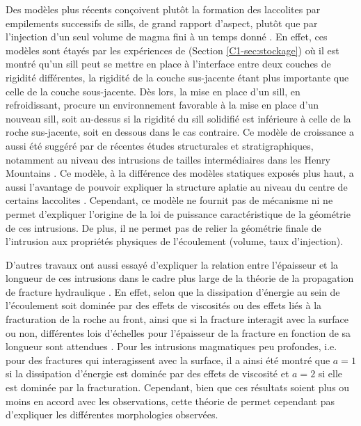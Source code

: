 Des modèles plus récents conçoivent plutôt la formation des laccolites
par empilements successifs de sills, de grand rapport d'aspect, plutôt
que par  l'injection d'un seul volume  de magma fini à  un temps donné
\citep{Menand:2011ki}.   En effet,  ces  modèles sont  étayés par  les
expériences de \citet{Kavanagh:2006ig} (Section \ref{C1-sec:stockage})
où il  est montré  qu'un sill  peut se mettre  en place  à l'interface
entre deux couches  de rigidité différentes, la rigidité  de la couche
sus-jacente   étant   plus  importante   que   celle   de  la   couche
sous-jacente. Dès lors, la mise  en place d'un sill, en refroidissant,
procure un  environnement favorable  à la mise  en place  d'un nouveau
sill, soit au-dessus si la rigidité du sill solidifié est inférieure à
celle  de  la   roche  sus-jacente,  soit  en  dessous   dans  le  cas
contraire. Ce modèle de croissance a aussi été suggéré par de récentes
études  structurales  et  stratigraphiques, notamment  au  niveau  des
intrusions  de   tailles  intermédiaires  dans  les   Henry  Mountains
\citep{Horsman:2005ct,Morgan:2008hj,Horsman:2009gea,Menand:2011ki}. Ce
modèle, à  la différence  des modèles statiques  exposés plus  haut, a
aussi l'avantage de  pouvoir expliquer la structure  aplatie au niveau
du centre de certains laccolites \citep{Morgan:2008hj}.  Cependant, ce
modèle ne fournit pas de  mécanisme ni ne permet d'expliquer l'origine
de  la  loi  de  puissance  caractéristique de  la  géométrie  de  ces
intrusions. De plus, il ne permet pas de relier la géométrie finale de
l'intrusion  aux propriétés  physiques de  l'écoulement (volume,  taux
d'injection).

D'autres  travaux  ont  aussi  essayé d'expliquer  la  relation  entre
l'épaisseur et la longueur de ces  intrusions dans le cadre plus large
de   la   théorie   de   la  propagation   de   fracture   hydraulique
\citep{Bunger:2008cl,Cruden:tg}.  En  effet, selon que  la dissipation
d'énergie  au sein  de l'écoulement  soit  dominée par  des effets  de
viscosités ou des effets liés à  la fracturation de la roche au front,
ainsi que si la fracture interagit avec la surface ou non, différentes
lois  d'échelles pour  l'épaisseur de  la fracture  en fonction  de sa
longueur  sont attendues  \citep{Savitski:2002gy,Bunger:2005em}.  Pour
les intrusions magmatiques peu profondes, i.e.  pour des fractures qui
interagissent avec la  surface, il a ainsi été montré  que $a=1$ si la
dissipation d'énergie est dominée par des effets de viscosité et $a=2$
si  elle est  dominée par  la  fracturation. Cependant,  bien que  ces
résultats soient plus ou moins  en accord avec les observations, cette
théorie   de  permet   cependant  pas   d'expliquer  les   différentes
morphologies observées.

